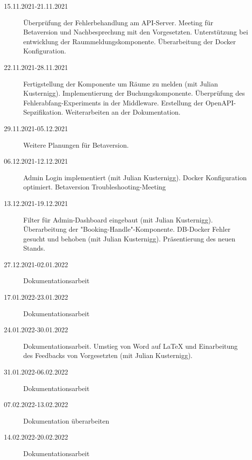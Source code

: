 \begin{description}
    \item[15.11.2021-21.11.2021] Überprüfung der Fehlerbehandlung am API-Server. Meeting für Betaversion und Nachbesprechung mit den Vorgesetzten. Unterstützung bei entwicklung der Raummeldungskomponente. Überarbeitung der Docker Konfiguration.
    \item[22.11.2021-28.11.2021] Fertigstellung der Komponente um Räume zu melden (mit Julian Kusternigg). Implementierung der Buchungskomponente. Überprüfung des Fehlerabfang-Experiments in der Middleware. Erstellung der OpenAPI-Sepzifikation. Weiterarbeiten an der Dokumentation.
    \item[29.11.2021-05.12.2021] Weitere Planungen für Betaversion.
    \item[06.12.2021-12.12.2021] Admin Login implementiert (mit Julian Kusternigg). Docker Konfiguration optimiert. Betaversion Troubleshooting-Meeting
    \item[13.12.2021-19.12.2021] Filter für Admin-Dashboard eingebaut (mit Julian Kusternigg). Überarbeitung der "Booking-Handle"-Komponente. DB-Docker Fehler gesucht und behoben (mit Julian Kusternigg). Präsentierung des neuen Stands.
    \item[27.12.2021-02.01.2022] Dokumentationsarbeit 
    \item[17.01.2022-23.01.2022] Dokumentationsarbeit
    \item[24.01.2022-30.01.2022] Dokumentationsarbeit. Umstieg von Word auf LaTeX und Einarbeitung des Feedbacks von Vorgesetzten (mit Julian Kusternigg). 
    \item[31.01.2022-06.02.2022] Dokumentationsarbeit
    \item[07.02.2022-13.02.2022] Dokumentation überarbeiten
    \item[14.02.2022-20.02.2022] Dokumentationsarbeit
\end{description}